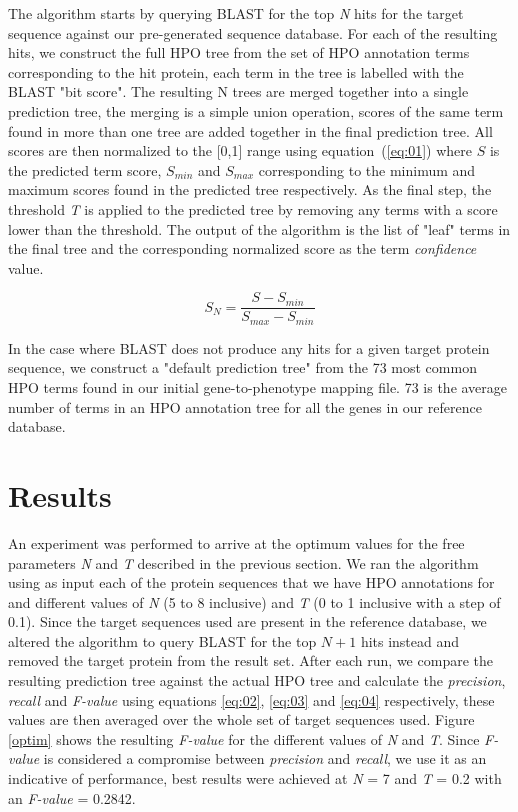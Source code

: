 \documentclass{bioinfo}
\begin{document}
The algorithm starts by querying BLAST for the top \textit{N} hits for the target sequence against our pre-generated sequence database. For each of the resulting hits, we construct the full HPO tree from the set of HPO annotation terms corresponding to the hit protein, each term in the tree is labelled with the BLAST "bit score". The resulting N trees are merged together into a single prediction tree, the merging is a simple union operation, scores of the same term found in more than one tree are added together in the final prediction tree. All scores are then normalized to the [0,1] range using equation~(\ref{eq:01}) where $S$ is the predicted term score, $S_{min}$ and $S_{max}$ corresponding to the minimum and maximum scores found in the predicted tree respectively. As the final step, the threshold \textit{T} is applied to the predicted tree by removing any terms with a score lower than the threshold. The output of the algorithm is the list of "leaf" terms in the final tree and the corresponding normalized score as the term \textit{confidence} value.

\begin{equation}
S_N = \frac{S - S_{min}}{S_{max} - S_{min}}
\label{eq:01}
\end{equation}

In the case where BLAST does not produce any hits for a given target protein sequence, we construct a "default prediction tree" from the 73 most common HPO terms found in our initial gene-to-phenotype mapping file. 73 is the average number of terms in an HPO annotation tree for all the genes in our reference database.

\section{Results}

An experiment was performed to arrive at the optimum values for the free parameters \textit{N} and \textit{T} described in the previous section. We ran the algorithm using as input each of the protein sequences that we have HPO annotations for and different values of \textit{N} (5 to 8 inclusive) and \textit{T} (0 to 1 inclusive with a step of 0.1). Since the target sequences used are present in the reference database, we altered the algorithm to query BLAST for the top $N + 1$ hits instead and removed the target protein from the result set. After each run, we compare the resulting prediction tree against the actual HPO tree and calculate the \textit{precision}, \textit{recall} and \textit{F-value} using equations \ref{eq:02}, \ref{eq:03} and \ref{eq:04} respectively, these values are then averaged over the whole set of target sequences used. Figure \ref{optim} shows the resulting \textit{F-value} for the different values of \textit{N} and \textit{T}. Since \textit{F-value} is considered a compromise between \textit{precision} and \textit{recall}, we use it as an indicative of performance, best results were achieved at \textit{N} = 7 and \textit{T} = 0.2 with an \textit{F-value} = 0.2842.
\end{document}
